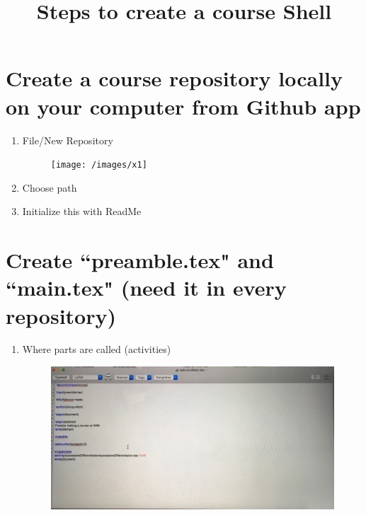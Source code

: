 \documentclass{ximera}
\title{Steps to create a course Shell }
\begin{document}
\begin{abstract}
\end{abstract}
\maketitle

\section{Create a course repository locally on your computer from Github app}
\begin{enumerate}
\item File/New Repository
\begin{center}
\begin{figure}[h]
\texttt{[image: /images/x1]}
\end{figure}
\end{center}
\item	Choose path
\item Initialize this with ReadMe
\end{enumerate}

\section{Create ``preamble.tex" and ``main.tex" (need it in every repository)}
\begin{enumerate}
\item Where parts are called (activities)
\begin{center}
\begin{figure}
\includegraphics[scale=.07]{images/main}
\end{figure}
\end{center}
\end{enumerate}
\end{document}
